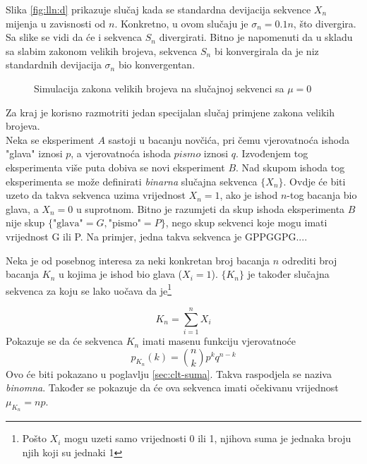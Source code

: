 Slika \ref{fig:lln:d} prikazuje slučaj kada se standardna devijacija sekvence
$X_n$ mijenja u zavisnosti od $n$. Konkretno, u ovom slučaju je $\sigma_n =
0.1n$, što divergira. Sa slike se vidi da će i sekvenca $S_n$ divergirati. Bitno
je napomenuti da u skladu sa slabim zakonom velikih brojeva, sekvenca $S_n$ bi
konvergirala da je niz standardnih devijacija $\sigma_n$ bio konvergentan.

\begin{figure}[H]
  \centering
	\caption{Simulacija zakona velikih brojeva na slučajnoj sekvenci sa $\mu=0$}
  \label{fig:lln}
\end{figure}

Za kraj je korisno razmotriti jedan specijalan slučaj primjene zakona velikih
brojeva. \\

Neka se eksperiment $A$ sastoji u bacanju novčića, pri čemu vjerovatnoća ishoda
"glava" iznosi $p$, a vjerovatnoća ishoda $pismo$ iznosi $q$. Izvođenjem tog
eksperimenta više puta dobiva se novi eksperiment $B$. Nad skupom ishoda tog
eksperimenta se može definirati \textit{binarna} slučajna sekvenca $\{X_n\}$.
Ovdje će biti uzeto da takva sekvenca uzima vrijednost $X_n=1$, ako je ishod
$n$-tog bacanja bio glava, a $X_n=0$ u suprotnom. Bitno je razumjeti da skup
ishoda eksperimenta $B$ nije skup $\{\text{"glava"}=G, \text{"pismo"}=P\}$, nego
skup sekvenci koje mogu imati vrijednost G ili P. Na primjer, jedna takva
sekvenca je GPPGGPG....

Neka je od posebnog interesa za neki konkretan broj bacanja $n$ odrediti broj
bacanja $K_n$ u kojima je ishod bio glava ($X_i=1$). $\{K_n\}$ je također
slučajna sekvenca za koju se lako uočava da je\footnote{Pošto $X_i$ mogu uzeti
samo vrijednosti 0 ili 1, njihova suma je jednaka broju njih koji su jednaki 1}

\begin{equation}
  K_n = \sum_{i=1}^{n} X_i 
\end{equation}
%
Pokazuje se da će sekvenca $K_n$ imati masenu funkciju vjerovatnoće
\begin{equation}
  p_{K_n}(k) = \binom{n}{k} p^k q^{n-k}
\end{equation}
%
Ovo će biti pokazano u poglavlju \ref{sec:clt-suma}. Takva raspodjela se naziva
\textit{binomna}. Također se pokazuje da će ova sekvenca imati očekivanu
vrijednost $\mu_{K_n}=np$.

